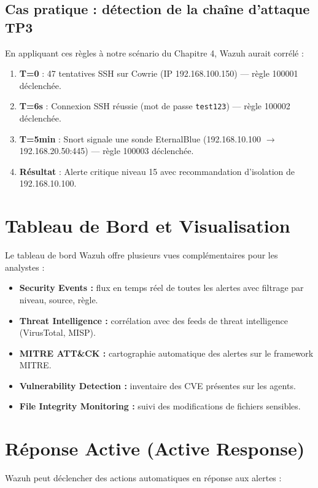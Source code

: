 \documentclass[12pt,a4paper,openany]{report}
\begin{document}
\subsection{Cas pratique : détection de la chaîne d'attaque TP3}

En appliquant ces règles à notre scénario du Chapitre 4, Wazuh aurait corrélé :
\begin{enumerate}
    \item \textbf{T=0} : 47 tentatives SSH sur Cowrie (IP 192.168.100.150) --- règle 100001 déclenchée.
    \item \textbf{T=6s} : Connexion SSH réussie (mot de passe \texttt{test123}) --- règle 100002 déclenchée.
    \item \textbf{T=5min} : Snort signale une sonde EternalBlue (192.168.10.100 $\rightarrow$ 192.168.20.50:445) --- règle 100003 déclenchée.
    \item \textbf{Résultat} : Alerte critique niveau 15 avec recommandation d'isolation de 192.168.10.100.
\end{enumerate}

\section{Tableau de Bord et Visualisation}

Le tableau de bord Wazuh offre plusieurs vues complémentaires pour les analystes :

\begin{itemize}
    \item \textbf{Security Events :} flux en temps réel de toutes les alertes avec filtrage par niveau, source, règle.
    \item \textbf{Threat Intelligence :} corrélation avec des feeds de threat intelligence (VirusTotal, MISP).
    \item \textbf{MITRE ATT\&CK :} cartographie automatique des alertes sur le framework MITRE.
    \item \textbf{Vulnerability Detection :} inventaire des CVE présentes sur les agents.
    \item \textbf{File Integrity Monitoring :} suivi des modifications de fichiers sensibles.
\end{itemize}

\section{Réponse Active (Active Response)}

Wazuh peut déclencher des actions automatiques en réponse aux alertes :
\end{document}
